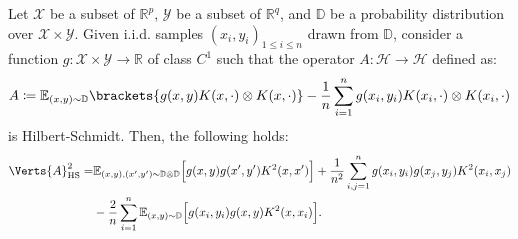 \begin{lemma}\label{lem:hs_identity}
{
Let $\mathcal{X}$ be a subset of $\mathbb{R}^p$, $\mathcal{Y}$ be a subset of $\mathbb{R}^q$, and $\mathbb{D}$ be a probability distribution over $\mathcal{X}\times\mathcal{Y}$. Given i.i.d. samples $(x_i,y_i)_{1\leq i\leq n}$ drawn from $\mathbb{D}$, consider a function $g:\mathcal{X}\times\mathcal{Y}\to\mathbb{R}$ of class $C^1$ such that the operator $A:\mathcal{H}\to\mathcal{H}$ defined as:
\begin{equation*}
    A\coloneqq\mathbb{E}_{(x,y)\sim\mathbb{D}}\brackets{g(x,y)K(x,\cdot)\otimes K(x,\cdot)}-\frac{1}{n}\sum_{i=1}^n g(x_i,y_i)K(x_i,\cdot)\otimes K(x_i,\cdot)
\end{equation*}
is Hilbert-Schmidt. Then, the following holds:
\begin{align*}
    \Verts{A}_{\hs}^2=&\mathbb{E}_{(x,y),(x',y')\sim\mathbb{D}\otimes\mathbb{D}}\Big[g(x,y)g(x',y')K^2(x,x')\Big]+\frac{1}{n^2}\sum_{i,j=1}^n g(x_i, y_i)g(x_j, y_j)K^2(x_i,x_j)\\
    &-\frac{2}{n}\sum_{i=1}^n\mathbb{E}_{(x,y)\sim\mathbb{D}}\Big[g(x_i, y_i)g(x, y)K^2(x,x_i)\Big].
\end{align*}
}
\end{lemma}

